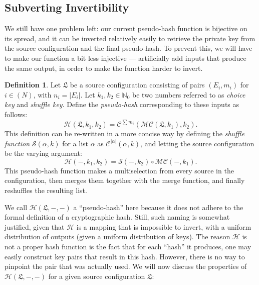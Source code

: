 \documentclass[a4paper, 10pt]{article}
\theoremstyle{plain}
\theoremstyle{definition}
\newtheorem{definition}[theorem]{Definition}
\newcommand{\N}{\mathbb{N}}
\newcommand{\cc}{\mathcal{C}}
\newcommand{\conf}{\mathfrak{L}}
\newcommand{\m}{\mathcal{M}}
\newcommand{\mc}{\mathcal{MC}}
\newcommand{\h}{\mathcal{H}}
\newcommand{\s}{\mathcal{S}}
\begin{document}

\subsection{Subverting Invertibility} \label{subv}

We still have one problem left: our current pseudo-hash function is bijective on its spread, and it can be inverted relatively easily to retrieve the private key from the source configuration and the final pseudo-hash. To prevent this, we will have to make our function a bit less injective --- artificially add inputs that produce the same output, in order to make the function harder to invert.\\

\begin{definition}
  Let $\conf$ be a source configuration consisting of pairs $(E_i, m_i)$ for $i \in (N)$, with $n_i = |E_i|$. Let $k_1, k_2 \in \N_0$ be two numbers referred to as \emph{choice key} and \emph{shuffle key}. Define the \emph{pseudo-hash} corresponding to these inputs as follows:
  \[
    \h(\conf, k_1, k_2) = \cc^{\sum m_i} (\mc(\conf, k_1), k_2).
  \]
  This definition can be re-written in a more concise way by defining the \emph{shuffle function} $\s(\alpha, k)$ for a list $\alpha$ as $\cc^{|\alpha|}(\alpha, k)$, and letting the source configuration be the varying argument:
  \[
    \h(-, k_1, k_2) = \s(-, k_2) \circ \mc(-, k_1).
  \]
  This pseudo-hash function makes a multiselection from every source in the configuration, then merges them together with the merge function, and finally reshuffles the resulting list.\\
\end{definition}

We call $\h(\conf, -, -)$ a ``pseudo-hash'' here because it does not adhere to the formal definition of a cryptographic hash. Still, such naming is somewhat justified, given that $\h$ is a mapping that is impossible to invert, with a uniform distribution of outputs (given a uniform distribution of keys). The reason $\h$ is not a proper hash function is the fact that for each ``hash'' it produces, one may easily construct key pairs that result in this hash. However, there is no way to pinpoint the pair that was actually used. We will now discuss the properties of $\h(\conf, -, -)$ for a given source configuration $\conf$:
\end{document}
